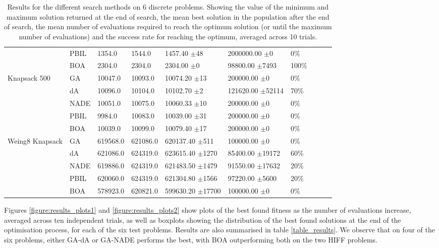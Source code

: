 \documentclass[twoside]{article}
\begin{document}
\begin{table}[t!]
{\begin{tabular}{ | p{1.8cm} | l | l | l | l | l | l | l | l | p{1cm} |}
 & PBIL & 1354.0 & 1544.0 & 1457.40 \(\pm\)48 & 2000000.00 \(\pm\)0 & 0\%\\
 & BOA & 2304.0 & 2304.0 & 2304.00 \(\pm\)0 & 98800.00 \(\pm\)7493 & 100\%\\\hline
Knapsack 500 & GA & 10047.0 & 10093.0 & 10074.20 \(\pm\)13 & 200000.00 \(\pm\)0 & 0\%\\
 & dA & 10096.0 & 10104.0 & 10102.70 \(\pm\)2 & 121620.00 \(\pm\)52114 & 70\%\\
 & NADE & 10051.0 & 10075.0 & 10060.33 \(\pm\)10 & 200000.00 \(\pm\)0 & 0\%\\
 & PBIL & 9984.0 & 10083.0 & 10039.00 \(\pm\)31 & 200000.00 \(\pm\)0 & 0\%\\
 & BOA & 10039.0 & 10099.0 & 10079.40 \(\pm\)17 & 200000.00 \(\pm\)0 & 0\%\\\hline
Weing8 Knapsack & GA & 619568.0 & 621086.0 & 620137.40 \(\pm\)511 & 100000.00 \(\pm\)0 & 0\%\\
 & dA & 621086.0 & 624319.0 & 623615.40 \(\pm\)1270 & 85400.00 \(\pm\)19172 & 60\%\\
 & NADE & 619886.0 & 624319.0 & 621483.50 \(\pm\)1479 & 91550.00 \(\pm\)17632 & 20\%\\
 & PBIL & 620060.0 & 624319.0 & 621304.80 \(\pm\)1566 & 97220.00 \(\pm\)5600 & 20\%\\
 & BOA & 578923.0 & 620821.0 & 599630.20 \(\pm\)17700 & 100000.00 \(\pm\)0 & 0\%\\\hline
    \end{tabular}
    }
    \caption{Results for the different search methods on 6 discrete problems. Showing the value of the minimum and maximum solution returned at the end of search, the mean best solution in the population after the end of search, the mean number of evaluations required to reach the optimum solution (or until the maximum number of evaluations) and the success rate for reaching the optimum, averaged across 10 trials.}
        \label{table:main_results}

\end{table}

Figures \ref{figure:results_plots1} and \ref{figure:results_plots2} show plots of the best found fitness as the number of evaluations increase, averaged across ten independent trials, as well as boxplots showing the distribution of the best found solutions at the end of the optimisation process, for each of the six test problems. Results are also summarised in table \ref{table_results}. We observe that on four of the six problems, either GA-dA or GA-NADE performs the best, with BOA outperforming both on the two HIFF problems.
\end{document}
